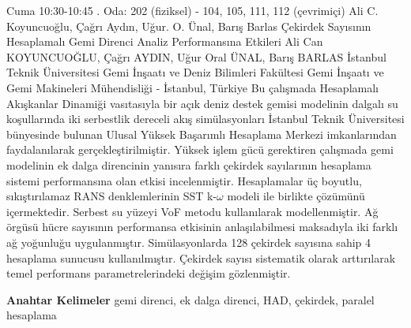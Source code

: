 
    \begin{abstract_basarim}
    {Cuma 10:30-10:45}
    {.}
    {Oda: 202 (fiziksel) - 104, 105, 111, 112 (çevrimiçi)}
    {Ali C. Koyuncuoğlu, Çağrı Aydın, Uğur. O. Ünal, Barış Barlas}
    {Çekirdek Sayısının Hesaplamalı Gemi Direnci Analiz Performansına Etkileri}
    {%
    Ali Can KOYUNCUOĞLU, Çağrı AYDIN, Uğur Oral ÜNAL, Barış BARLAS}
    {%
    }
    {%
    İstanbul Teknik Üniversitesi Gemi İnşaatı ve Deniz Bilimleri Fakültesi Gemi İnşaatı ve Gemi Makineleri Mühendisliği - İstanbul, Türkiye}
    Bu çalışmada Hesaplamalı Akışkanlar Dinamiği vasıtasıyla bir açık deniz destek gemisi modelinin dalgalı su koşullarında iki serbestlik dereceli akış simülasyonları İstanbul Teknik Üniversitesi bünyesinde bulunan Ulusal Yüksek Başarımlı Hesaplama Merkezi imkanlarından faydalanılarak gerçekleştirilmiştir. Yüksek işlem gücü gerektiren çalışmada gemi modelinin ek dalga direncinin yanısıra farklı çekirdek sayılarının hesaplama sistemi performansına olan etkisi incelenmiştir. Hesaplamalar üç boyutlu, sıkıştırılamaz RANS denklemlerinin SST k-$\omega$ modeli ile birlikte çözümünü içermektedir. Serbest su yüzeyi VoF metodu kullanılarak modellenmiştir. Ağ örgüsü hücre sayısının performansa etkisinin anlaşılabilmesi maksadıyla iki farklı ağ yoğunluğu uygulanmıştır. Simülasyonlarda 128 çekirdek sayısına sahip 4 hesaplama sunucusu kullanılmıştır. Çekirdek sayısı sistematik olarak arttırılarak temel performans parametrelerindeki değişim gözlenmiştir. 
    
            \textbf{Anahtar Kelimeler} \newline{}gemi direnci, ek dalga direnci, HAD, çekirdek, paralel hesaplama
    \end{abstract_basarim}
    